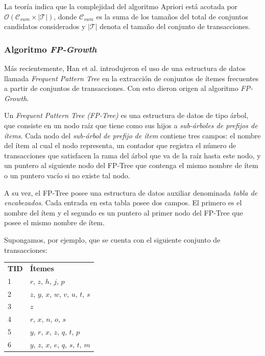 La teoría indica que la complejidad del algoritmo Apriori está acotada por $\mathcal{O}(\mathcal{C}_{\mathit{sum}} \times |\mathcal{T}|)$, donde $\mathcal{C}_{\mathit{sum}}$ es la suma de los tamaños del total de conjuntos candidatos considerados y $|\mathcal{T}|$ denota el tamaño del conjunto de transacciones.

\subsubsection{Algoritmo \textit{FP-Growth}}

Más recientemente, Han et al. introdujeron el uso de una estructura de datos llamada \textit{Frequent Pattern Tree}\cite{han2004mining} en la extracción de conjuntos de ítemes frecuentes a partir de conjuntos de transacciones. Con esto dieron origen al algoritmo \textit{FP-Growth}.

Un \textit{Frequent Pattern Tree (FP-Tree)} es una estructura de datos de tipo árbol, que consiste en un nodo raíz que tiene como sus hijos a \textit{sub-árboles de prefijos de ítems}. Cada nodo del \textit{sub-árbol de prefijo de ítem} contiene tres campos: el nombre del ítem al cual el nodo representa, un contador que registra el número de transacciones que satisfacen la rama del árbol que va de la raíz hasta este nodo, y un puntero al siguiente nodo del FP-Tree que contenga el mismo nombre de ítem o un puntero vacío si no existe tal nodo.

A su vez, el FP-Tree posee una estructura de datos auxiliar denominada \textit{tabla de encabezados}. Cada entrada en esta tabla posee dos campos. El primero es el nombre del ítem y el segundo es un puntero al primer nodo del FP-Tree que posee el mismo nombre de ítem.

Supongamos, por ejemplo, que se cuenta con el siguiente conjunto de transacciones:

\begin{tabular}{l l}
\textbf{TID} & \textbf{Ítemes} \\
1 & $r$, $z$, $h$, $j$, $p$ \\
2 & $z$, $y$, $x$, $w$, $v$, $u$, $t$, $s$ \\
3 & $z$ \\
4 & $r$, $x$, $n$, $o$, $s$ \\
5 & $y$, $r$, $x$, $z$, $q$, $t$, $p$ \\
6 & $y$, $z$, $x$, $e$, $q$, $s$, $t$, $m$ \\
\end{tabular}

